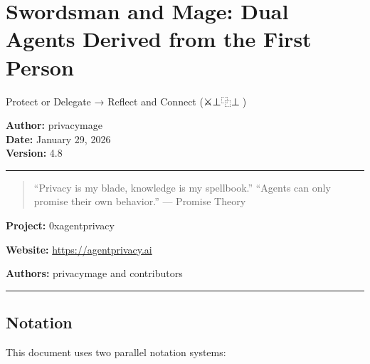 \documentclass[
]{article}
\author{}
\date{}
\begin{document}
\section{Swordsman and Mage: Dual Agents Derived from the First
Person}\label{swordsman-and-mage-dual-agents-derived-from-the-first-person}

Protect or Delegate → Reflect and Connect (⚔️⊥⿻⊥🧙)🙂

\textbf{Author:} privacymage\\
\textbf{Date:} January 29, 2026\\
\textbf{Version:} 4.8

\begin{center}\rule{0.5\linewidth}{0.5pt}\end{center}

\begin{quote}
``Privacy is my blade, knowledge is my spellbook.'' ``Agents can only
promise their own behavior.'' --- Promise Theory
\end{quote}

\textbf{Project:} \textbar{} 0xagentprivacy

\textbf{Website:} \textbar{} \url{https://agentprivacy.ai}

\textbf{Authors:} \textbar{} privacymage and contributors

\begin{center}\rule{0.5\linewidth}{0.5pt}\end{center}

\subsection{Notation}\label{notation}

This document uses two parallel notation systems:
\end{document}
